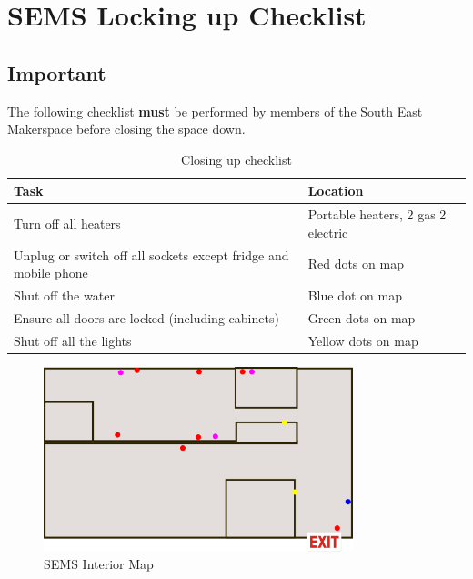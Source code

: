 \documentclass{article}
\begin{document}


\section*{SEMS Locking up Checklist}

\subsection*{Important}
The following checklist \textbf{must} be performed by members of the South East Makerspace before closing the space down.


\begin{table}[h]
	\centering
	\caption{Closing up checklist} 
	\label{tab:checklist}
	\begin{tabularx}{.9\textwidth}{XX}
		\toprule
		\textbf{Task} & \textbf{Location} \\ 
		\midrule
		Turn off all heaters & Portable heaters, 2 gas 2 electric \\ 
		Unplug or switch off all sockets except fridge and mobile phone & Red dots on map \\ 
		Shut off the water & Blue dot on map \\ 
		Ensure all doors are locked (including cabinets) & Green dots on map \\ 
		Shut off all the lights & Yellow dots on map \\ 
		\bottomrule
	\end{tabularx}
\end{table}

%
\begin{figure}[ht]
	\centering
	\includegraphics[width=9cm]{Sems}
	\caption{SEMS Interior Map}
	\label{fig:sems_map}
\end{figure}
%
\end{document}
